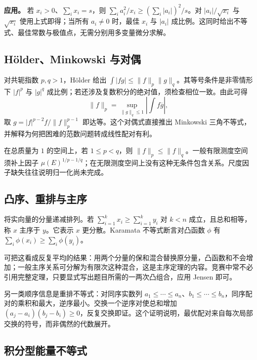 \documentclass[UTF8,12pt,a4paper,fontset=fandol]{ctexart}
\begin{document}
\textbf{应用。} 若 $x_i>0$、$\sum_i x_i=s$，则 $\sum_i a_i^2/x_i\geq(\sum_i|a_i|)^2/s$。对 $|a_i|/\sqrt{x_i}$ 与 $\sqrt{x_i}$ 使用上式即得；当所有 $a_i\neq0$ 时，最佳 $x_i$ 与 $|a_i|$ 成比例。这同时给出不等式、最佳常数与极值点，无需分别用多变量微分求解。

\subsection{Hölder、Minkowski 与对偶}

\label{app:inequality-holder}

对共轭指数 $p,q>1$，Hölder 给出 $\int|fg|\leq\|f\|_p\|g\|_q$。其等号条件是非零情形下 $|f|^p$ 与 $|g|^q$ 成比例；若还涉及复数积分的绝对值，须检查相位一致。由此可得
\[
\|f\|_p=\sup_{\|g\|_q\leq1}\left|\int f\overline g\right|,
\]
取 $g=|f|^{p-2}f/\|f\|_p^{p-1}$ 即达等。这个对偶式直接推出 Minkowski 三角不等式，并解释为何把困难的范数问题转成线性配对有利。

在总质量为 $1$ 的空间上，若 $1\leq p<q$，则 $\|f\|_p\leq\|f\|_q$。一般有限测度空间须补上因子 $\mu(E)^{1/p-1/q}$；在无限测度空间上没有这种无条件包含关系。尺度因子缺失往往说明归一化尚未完成。

\subsection{凸序、重排与主序}

\label{app:inequality-majorization}

将实向量的分量递减排列。若 $\sum_{i=1}^kx_i\geq\sum_{i=1}^ky_i$ 对 $k<n$ 成立，且总和相等，称 $x$ 主序于 $y$。它表示 $x$ 更分散。Karamata 不等式断言对凸函数 $\phi$ 有 $\sum_i\phi(x_i)\geq\sum_i\phi(y_i)$。

可把这看成反复平均的结果：用两个分量的保和混合替换原分量，凸函数和不会增加；一般主序关系可分解为有限次这种混合，这是主序定理的内容。竞赛中常不必引用完整定理，只要显式写出题目所需的一两次凸组合，应用 Jensen 即可。

另一类顺序信息是重排不等式：对同序实数列 $a_1\leq\cdots\leq a_n$、$b_1\leq\cdots\leq b_n$，同序配对的乘积和最大，逆序最小。交换一个逆序对使总和增加 $(a_j-a_i)(b_j-b_i)\geq0$，反复交换即证。这个证明说明，最优配对来自每次局部交换的符号，而非偶然的代数展开。

\subsection{积分型能量不等式}

\label{app:inequality-energy}
\end{document}
